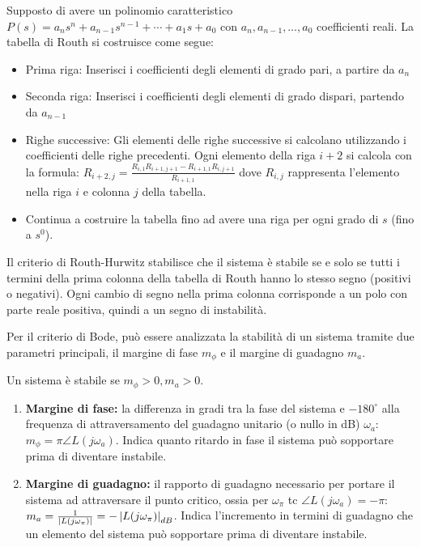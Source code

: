 Supposto di avere un polinomio caratteristico \(P(s)=a_n s^n+a_{n-1}s^{n-1}+⋯+a_1 s+a_0\) con \(a_n,a_{n-1},…,a_0\) coefficienti reali. La tabella di Routh si costruisce come segue:

\begin{itemize}
    \item Prima riga: Inserisci i coefficienti degli elementi di grado pari, a partire da \(a_n\)
    \item Seconda riga: Inserisci i coefficienti degli elementi di grado dispari, partendo da \(a_{n-1}\)
    \item Righe successive: Gli elementi delle righe successive si calcolano utilizzando i coefficienti delle righe precedenti. Ogni elemento della riga \(i+2\) si calcola con la formula: \(R_{i+2,j} =\frac{ R_{i,1} R_{i+1,j+1} - R_{i+1,1} R_{i,j+1}}{R_{i+1,1}}\)
    dove \(R_{i,j}\) rappresenta l'elemento nella riga \(i\) e colonna \(j\) della tabella.
    \item Continua a costruire la tabella fino ad avere una riga per ogni grado di \(s\) (fino a \(s^0\)).
\end{itemize}


Il criterio di Routh-Hurwitz stabilisce che il sistema è stabile se e solo se tutti i termini della prima colonna della tabella di Routh hanno lo stesso segno (positivi o negativi).
Ogni cambio di segno nella prima colonna corrisponde a un polo con parte reale positiva, quindi a un segno di instabilità.

\label{CriterioBode}
Per il criterio di Bode, può essere analizzata la stabilità di un sistema tramite due parametri principali, il margine di fase \(m_\phi\) e il margine di guadagno \(m_a\). 

\begin{center}
Un sistema è stabile se \(m_\phi>0,m_a>0\).
\end{center}

\begin{enumerate}
    \item \textbf{Margine di fase:} la differenza in gradi tra la fase del sistema e \(-180^\circ\) alla frequenza di attraversamento del guadagno unitario (o nullo in dB) \(\omega_a\): \(m_\phi=\pi\angle{L(j\omega_a)}\). Indica quanto ritardo in fase il sistema può sopportare prima di diventare instabile. 
    \item \textbf{Margine di guadagno:} il rapporto di guadagno necessario per portare il sistema ad attraversare il punto critico, ossia per \(\omega_\pi\) tc \(\angle{L(j\omega_a)}=-\pi\): \(m_a=\frac{1}{\left|L(j\omega_\pi)\right|}=-\left|L(j\omega_\pi)\right|_{dB}\). Indica l'incremento in termini di guadagno che un elemento del sistema può sopportare prima di diventare instabile. 
\end{enumerate}

